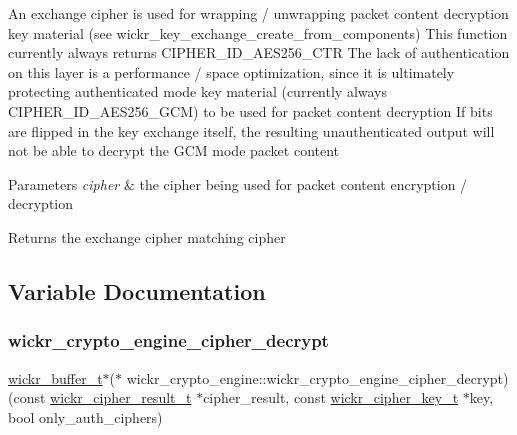 An exchange cipher is used for wrapping / unwrapping packet content decryption key material (see wickr\+\_\+key\+\_\+exchange\+\_\+create\+\_\+from\+\_\+components) This function currently always returns C\+I\+P\+H\+E\+R\+\_\+\+I\+D\+\_\+\+A\+E\+S256\+\_\+\+C\+TR The lack of authentication on this layer is a performance / space optimization, since it is ultimately protecting authenticated mode key material (currently always C\+I\+P\+H\+E\+R\+\_\+\+I\+D\+\_\+\+A\+E\+S256\+\_\+\+G\+CM) to be used for packet content decryption If bits are flipped in the key exchange itself, the resulting unauthenticated output will not be able to decrypt the G\+CM mode packet content


\begin{DoxyParams}{Parameters}
{\em cipher} & the cipher being used for packet content encryption / decryption \\
\hline
\end{DoxyParams}
\begin{DoxyReturn}{Returns}
the exchange cipher matching \textquotesingle{}cipher\textquotesingle{} 
\end{DoxyReturn}


\subsection{Variable Documentation}
\mbox{\label{group__wickr__crypto__engine_ga81cff182bb87f963996b75891e242ed4}} 
\subsubsection{\texorpdfstring{wickr\+\_\+crypto\+\_\+engine\+\_\+cipher\+\_\+decrypt}{wickr\_crypto\_engine\_cipher\_decrypt}}
{\footnotesize\ttfamily \hyperlink{structwickr__buffer}{wickr\+\_\+buffer\+\_\+t}$\ast$($\ast$ wickr\+\_\+crypto\+\_\+engine\+::wickr\+\_\+crypto\+\_\+engine\+\_\+cipher\+\_\+decrypt) (const \hyperlink{structwickr__cipher__result}{wickr\+\_\+cipher\+\_\+result\+\_\+t} $\ast$cipher\+\_\+result, const \hyperlink{structwickr__cipher__key}{wickr\+\_\+cipher\+\_\+key\+\_\+t} $\ast$key, bool only\+\_\+auth\+\_\+ciphers)}

